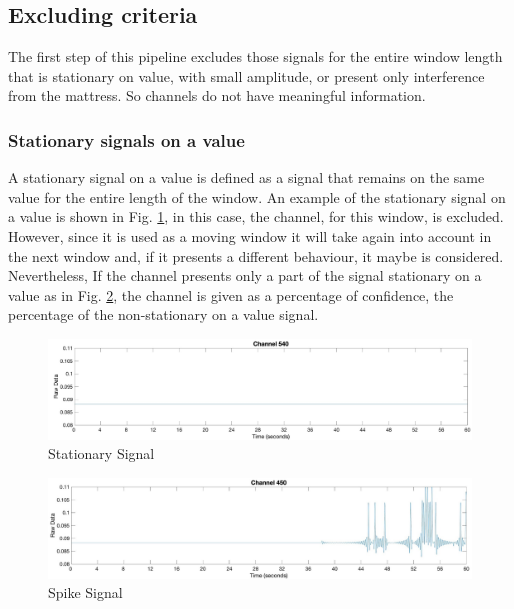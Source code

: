 \subsection{Excluding criteria}
The first step of this pipeline excludes those signals for the entire window length that is stationary on value, with small amplitude, or present only interference from the mattress. So channels do not have meaningful information.
\subsubsection*{Stationary signals on a value}\label{stationary}
A stationary signal on a value is defined as a signal that remains on the same value for the entire length of the window. An example of the stationary signal on a value is shown in Fig. \ref{fig:stationaryTotal}, in this case, the channel, for this window, is excluded.
However, since it is used as a moving window it will take again into account in the next window and, if it presents a different behaviour, it maybe is considered. 
Nevertheless, If the channel presents only a part of the signal stationary on a value as in Fig. \ref{fig:spikePartial}, the channel is given as a percentage of confidence, the percentage of the non-stationary on a value signal.
\vspace*{0.5cm}
\begin{figure}[H]
    \centering
    \includegraphics[width=\textwidth]{img/stationaryTotal.jpg}
    \caption{Stationary Signal}
    \label{fig:stationaryTotal}
\end{figure}
\vspace*{1.0cm}

\begin{figure}[H]
    \centering
    \includegraphics[width=\textwidth]{img/spakePartial.jpg}
    \caption{Spike Signal}
    \label{fig:spikePartial}
\end{figure}
\vspace*{1.0cm}


